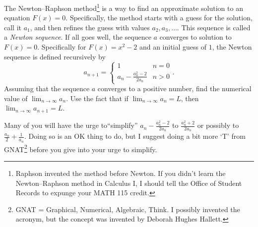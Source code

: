 \documentclass[12pt,fleqn]{exam}
\begin{document}
\begin{questions}
   \question [2] The Newton–Raphson method\footnote{Raphson invented
   the method before Newton. If you didn't learn the Newton–Raphson method
   in Calculus I, I should tell the Office of Student Records to 
   expunge your MATH 115 credit.} is a way to find an 
   approximate solution to an equation $F(x)=0$. Specifically,
   the method starts with a guess for the solution, call it $a_1$,
   and then refines the guess with values $a_2, a_3, \dots$. 
   This sequence is called a \emph{Newton sequence}.
   If all goes well, the sequence $a$ converges to 
   solution to $F(x)=0$. Specifically for $F(x) = x^2 - 2$ and
   an initial guess of $1$, the Newton sequence  is defined
   recursively by 
   \begin{equation*}
    a_{n+1} = \begin{cases} 1  & n=0  \\
                            a_n - \frac{a_n^2 - 2}{2 a_n} & n > 0
    \end{cases}.
\end{equation*}
Assuming that the sequence $a$ converges to a positive number, find the numerical
value of $\displaystyle \lim_{n \to \infty} a_n$.  Use the 
fact that if $\displaystyle \lim_{n \to \infty} a_n  = L$,
then $\displaystyle \lim_{n \to \infty} a_{n+1} = L$.

\quad Many of you will have the urge to``simplify'' $a_n - \frac{a_n^2 - 2}{2 a_n}$
to $\frac{a_n^2 + 2}{2 a_n}$ or possibly to 
$\frac{a_n}{2} + \frac{1}{a_n}$. Doing so is an OK thing to do,
but I suggest doing a bit more `T' from GNAT\footnote{GNAT = Graphical,
Numerical, Algebraic, Think. I possibly invented the acronym, but 
the concept was invented by Deborah Hughes Hallett.} before you give into your urge to simplify.


\end{questions}
\end{document}
